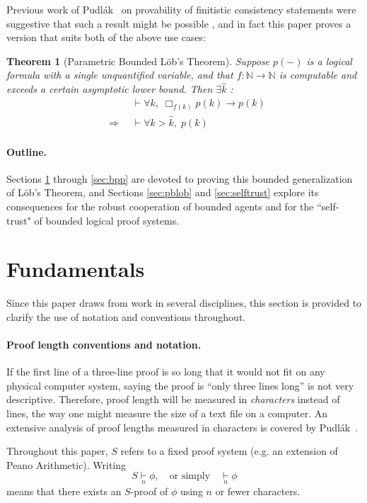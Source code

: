 \documentclass[onecolumn]{miri-tech-article}
\newcommand{\bred}[1]{{\color{red}{#1}}}
\newtheorem*{theorem*}{Theorem}
\numberwithin{equation}{section}
\theoremstyle{definition}
\newcommand{\NN}{\mathbb{N}}
\newcommand{\proves}[1]{\underset{#1}{\vdash}}
\newcommand{\bx}[1]{\Box_{#1}}
\renewcommand{\implies}{\rightarrow}
\renewcommand{\to}{\rightarrow}
\newcommand{\Implies}{\;\;\Rightarrow\;\;}
\renewcommand{\-}{^{-1}}
\begin{document}
Previous work of Pudl\'{a}k~\cite{Pudlak:1998} on provability of finitistic consistency statements were suggestive that such a result might be possible \bred{(I will need to elaborate this)}, and in fact this paper proves a version that suits both of the above use cases:

\begin{theorem*}[Parametric Bounded L\"{o}b's Theorem]
Suppose $p(-)$ is a logical formula with a single unquantified variable, and that $f:\NN \to \NN$ is computable and  exceeds a certain asymptotic lower bound.  Then $\exists\hat k$ :
\begin{align*}
             &\proves{} \forall k,\; \bx{f(k)}p(k) \implies p(k)\\
\Implies &\proves{} \forall k>\hat k, \; p(k)
\end{align*}
\end{theorem*}

\paragraph{Outline.} Sections \ref{sec:fund} through \ref{sec:bpp} are devoted to proving this bounded generalization of L\"{o}b's Theorem, and Sections \ref{sec:pblob} and \ref{sec:selftrust} explore its consequences for the robust cooperation of bounded agents and for the ``self-trust" of bounded logical proof systems.

\section{Fundamentals}\label{sec:fund}

Since this paper draws from work in several disciplines, this section is provided to clarify the use of notation and conventions throughout.

\paragraph{Proof length conventions and notation.}
If the first line of a three-line proof is so long that it would not fit on any physical computer system, saying the proof is ``only three lines long'' is not very descriptive.  Therefore, proof length will be measured in {\em characters} instead of lines, the way one might measure the size of a text file on a computer.  An extensive analysis of proof lengths measured in characters is covered by Pudl\'{a}k~\cite{Pudlak:1998}.

Throughout this paper, $S$ refers to a fixed proof system (e.g. an extension of Peano Arithmetic).  Writing
$$S \proves{n} \phi, \quad \text{or simply} \quad \proves{n} \phi$$
means that there exists an $S$-proof of $\phi$ using $n$ or fewer characters.  
\end{document}
